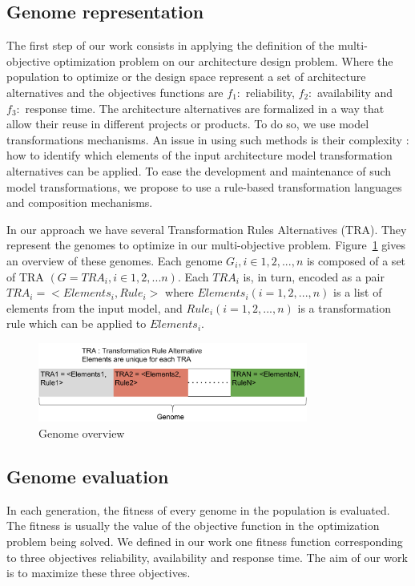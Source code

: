 \documentclass[conference]{IEEEtran}
\begin{document}
\subsection{Genome representation}
The first step of our work consists in applying the definition of the multi-objective optimization problem on our architecture design problem. Where the population to optimize or the design space represent a set of architecture alternatives and the objectives functions are $f_{1}:$ reliability, $f_{2}:$ availability and $f_{3}:$ response time. The architecture alternatives are formalized in a way that allow their reuse in different projects or products. To do so, we use model transformations mechanisms. An issue in using such methods is their complexity : how to identify which elements of the input architecture model transformation alternatives can be applied. To ease the development and maintenance of such model transformations, we propose to use a rule-based transformation languages and composition mechanisms. 

In our approach we have several Transformation Rules Alternatives (TRA). They represent the genomes to optimize in our multi-objective problem. Figure~\ref{genome} gives an overview of these genomes. Each genome $G_{i}, i \in {1,2,...,n}$ is composed of a set of TRA $(G = {TRA_{i}, i \in {1,2,...n}})$. Each $TRA_{i}$ is, in turn, encoded as a pair $TRA_{i} = <Elements_{i},Rule_{i}>$ where $Elements_{i} (i ={1,2,...,n})$ is a list of elements from the input model, and $Rule_{i} (i ={1,2,...,n})$ is a transformation rule which can be applied to $Elements_{i}$.

\begin{figure}[!t]
\centering
\includegraphics[width=3.49in]{genome.pdf}
\caption{Genome overview}
\label{genome}
\end{figure}

\subsection{Genome evaluation}
In each generation, the fitness of every genome in the population is evaluated. The fitness is usually the value of the objective function in the optimization problem being solved. We defined in our work one fitness function corresponding to three objectives reliability, availability and response time.
The aim of our work is to maximize these three objectives. 
\end{document}
